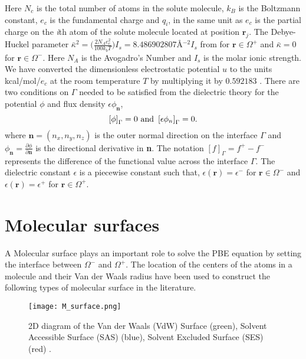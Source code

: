 Here $N_c$ is the total number of atoms in the solute molecule, $k_B$ is the Boltzmann constant, $e_c$ is the fundamental charge and $q_i$, in the same unit as $e_c$ is the partial charge on the \textit{i}th atom of the solute molecule located at position $\textbf{r}_j$. The Debye-Huckel parameter $\bar\kappa^2 =\Big(\frac{2N_A e_c^2}{100 k_b T}\Big)I_s =  8.486902807$\AA$^{-2} I_s$ from \cite{Holst:1993} for $\textbf{r} \in \Omega^+$ and $\bar\kappa=0$ for $\textbf{r} \in \Omega^-$. Here $N_A$ is  the Avogadro’s Number and $I_s$ is the molar ionic strength. We have converted the dimensionless electrostatic potential $u$ to the units kcal/mol/$e_c$ at the room temperature $T$ by multiplying it by $0.592183$ \cite{Holst:1993}. There are two conditions on $\Gamma$ needed to be satisfied from the dielectric theory for the potential $\phi$ and flux density $\epsilon \phi_\textbf{n} $, 
\begin{equation}
\left[\phi \right]_\Gamma = 0 \textnormal{ and } \left[\epsilon\phi_n\right]_\Gamma = 0. \label{ju_cond}
\end{equation}
where $\textbf{n}=(n_x,n_y,n_z)$ is the outer normal direction on the interface $\Gamma$ and $\phi_\textbf{n}= \frac{\partial \phi}{\partial\textbf{n}} $ is the directional derivative in \textbf{n}. The notation $[f]_\Gamma = f^+-f^-$ represents the difference of the functional value across the interface $\Gamma$. The dielectric constant $\epsilon$ is a piecewise constant such that, $\epsilon(\textbf{r})=\epsilon^-$ for $\textbf{r} \in \Omega^-$ and $\epsilon(\textbf{r})=\epsilon^+$ for $\textbf{r} \in \Omega^+$. 

\section{Molecular surfaces}
\label{sec:m_srface}
A Molecular surface plays an important role to solve the PBE equation by setting the interface between $\Omega^-$ and $\Omega^+$. The location of the centers of the atoms in a molecule and their Van der Waals radius have been used to construct the following types of molecular surface in the literature.  
\begin{figure}[!ht]
	\begin{center}
		\texttt{[image: M\_surface.png]}
	\end{center}
	\caption{2D diagram of the Van der Waals (VdW) Surface (green), Solvent Accessible Surface
(SAS) (blue), Solvent Excluded Surface (SES) (red) \cite{Quan2018}.}
\label{fig:M_surface}
\end{figure}

